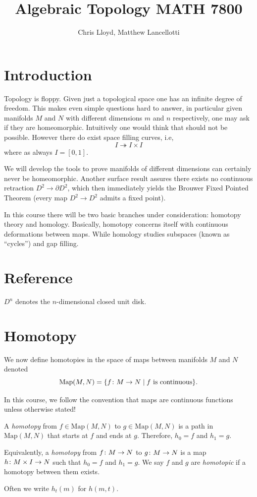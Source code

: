 \documentclass[11pt,leqno,oneside]{amsart}
\title[Algebraic Topology]{Algebraic Topology MATH 7800}
\author{Chris Lloyd, Matthew Lancellotti}
\date{}
\newenvironment{dateenv}{
  \vspace{1em}
}{
  \vspace{1em}
}
\newcommand{\mydate}[4]{
  \newdate{#1}{#2}{#3}{#4}
  \begin{dateenv}
    \hfill\displaydate{#1}
  \end{dateenv}
}
\numberwithin{thm}{section}
\renewcommand{\d}{\partial}
\newcommand{\x}{\times}
\newcommand{\Map}{\text{Map}}
\begin{document}
\maketitle \newpage

\mydate{d1}{18}{1}{2017}

\section{Introduction}

Topology is floppy. Given just a topological space one has an infinite
degree of freedom. This makes even simple questions hard to answer, in
particular given manifolds \(M\) and \(N\) with different dimensions
\(m\) and \(n\) respectively, one may ask if they are
homeomorphic. Intuitively one would think that should not be
possible. However there do exist space filling curves, i.e,
\[I \twoheadrightarrow I \times I\]
where as always \(I=[0,1]\).

We will develop the tools to prove manifolds of different dimensions can
certainly never be homeomorphic. Another surface result assures there exists no continuous
retraction \(D^2 \to \d D^2\), which then immediately yields the
Brouwer Fixed Pointed Theorem (every map \(D^2 \to D^2\) admits a
fixed point).

In this course there will be two basic branches under consideration:
homotopy theory and homology. Basically, homotopy concerns itself with
continuous deformations between maps. While homology studies subspaces
(known as ``cycles'') and gap filling.

\section{Reference}
%
\begin{defn}
  $D^n$ denotes the $n$-dimensional closed unit disk.
\end{defn}

\section{Homotopy}

We now define homotopies in the space of maps between manifolds \(M\)
and \(N\) denoted
\[\Map(M,N)=\{f \from M \to N \suchthat \text{$f$ is continuous}\}.\]

In this course, we follow the convention that maps are continuous
functions unless otherwise stated!

\begin{defn}
  A \emph{homotopy} from \(f \in \Map(M, N)\) to \(g \in \Map(M, N)\) is a path in $\Map(M, N)$ that starts at $f$ and ends at $g$.  Therefore, $h_0 = f$ and $h_1 = g$.

  Equivalently, a \emph{homotopy} from \(f \colon M \to N\) to \(g \colon M \to N\)
  is a map \(h\from M \x I \to N\) such that \(h_0=f\) and \(h_1=g\). We say \(f\) and
  \(g\) are \emph{homotopic} if a homotopy between them exists.

  Often we write \(h_t(m)\) for \(h(m,t)\).
\end{defn}
\end{document}
